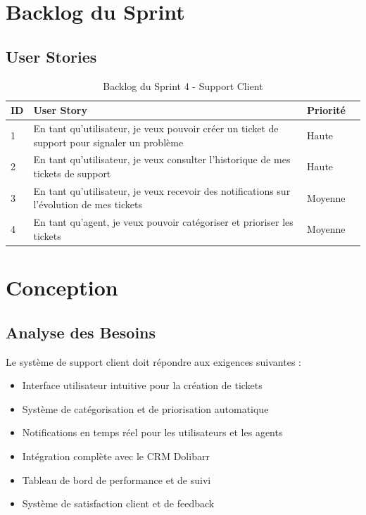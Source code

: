 \documentclass[12pt,a4paper]{report}
\begin{document}
\section{Backlog du Sprint}
\subsection{User Stories}
\begin{table}[H]
\centering
\begin{tabularx}{\textwidth}{|X|X|X|X|}
\hline
\textbf{ID} & \textbf{User Story} & \textbf{Priorité}  \\
\hline
1 & En tant qu'utilisateur, je veux pouvoir créer un ticket de support pour signaler un problème & Haute  \\
\hline
2 & En tant qu'utilisateur, je veux consulter l'historique de mes tickets de support & Haute  \\
\hline
3 & En tant qu'utilisateur, je veux recevoir des notifications sur l'évolution de mes tickets & Moyenne  \\
\hline
4 & En tant qu'agent, je veux pouvoir catégoriser et prioriser les tickets & Moyenne  \\
\hline
\end{tabularx}
\caption{Backlog du Sprint 4 - Support Client}
\end{table}

\section{Conception}
\subsection{Analyse des Besoins}
Le système de support client doit répondre aux exigences suivantes :
\begin{itemize}
\item Interface utilisateur intuitive pour la création de tickets
\item Système de catégorisation et de priorisation automatique
\item Notifications en temps réel pour les utilisateurs et les agents
\item Intégration complète avec le CRM Dolibarr
\item Tableau de bord de performance et de suivi
\item Système de satisfaction client et de feedback
\end{itemize}
\end{document}

